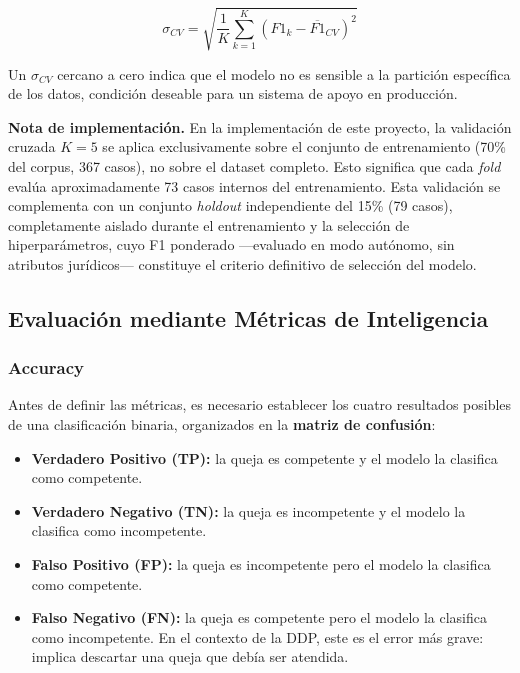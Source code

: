 \begin{equation}
  \sigma_{CV} = \sqrt{\frac{1}{K} \sum_{k=1}^{K} (F1_k - \overline{F1}_{CV})^2}
  \label{eq:sigma}
\end{equation}

Un $\sigma_{CV}$ cercano a cero indica que el modelo no es sensible a la
partición específica de los datos, condición deseable para un sistema de apoyo
en producción.

\noindent\textbf{Nota de implementación.} En la implementación de este proyecto,
la validación cruzada $K = 5$ se aplica exclusivamente sobre el conjunto de
entrenamiento (70\% del corpus, 367 casos), no sobre el dataset completo. Esto
significa que cada \textit{fold} evalúa aproximadamente 73 casos internos del
entrenamiento. Esta validación se complementa con un conjunto \textit{holdout}
independiente del 15\% (79 casos), completamente aislado durante el entrenamiento
y la selección de hiperparámetros, cuyo F1 ponderado —evaluado en modo autónomo,
sin atributos jurídicos— constituye el criterio definitivo de selección del
modelo.

\subsection{Evaluación mediante Métricas de Inteligencia}

\subsubsection*{Accuracy}
Antes de definir las métricas, es necesario establecer los cuatro resultados
posibles de una clasificación binaria, organizados en la
\textbf{matriz de confusión}:

\begin{itemize}
  \item \textbf{Verdadero Positivo (TP):} la queja es competente y el modelo
        la clasifica como competente.
  \item \textbf{Verdadero Negativo (TN):} la queja es incompetente y el modelo
        la clasifica como incompetente.
  \item \textbf{Falso Positivo (FP):} la queja es incompetente pero el modelo
        la clasifica como competente.
  \item \textbf{Falso Negativo (FN):} la queja es competente pero el modelo
        la clasifica como incompetente. En el contexto de la DDP, este es el
        error más grave: implica descartar una queja que debía ser atendida.
\end{itemize}

